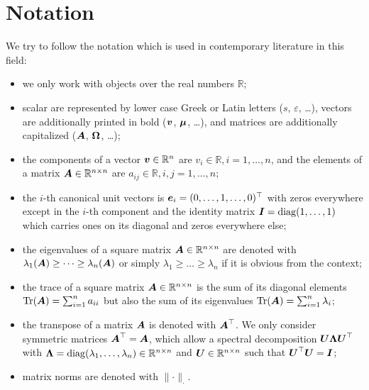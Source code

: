 \chapter*{Notation}
\label{chp:0-notation}

We try to follow the notation which is used in contemporary literature in this field:

\begin{itemize}
    \item we only work with objects over the real numbers $\mathbb{R}$;
    \item scalar are represented by lower case Greek or Latin letters ($s$, $\varepsilon$, \dots),
          vectors are additionally printed in bold ($\boldsymbol{v}$, $\boldsymbol{\mu}$, \dots),
          and matrices are additionally capitalized ($\boldsymbol{A}$, $\boldsymbol{\Omega}$, \dots);
    \item the components of a vector $\boldsymbol{v} \in \mathbb{R}^{n}$ are $v_i \in \mathbb{R}, i = 1, \dots, n$,
          and the elements of a matrix $\boldsymbol{A} \in \mathbb{R}^{n \times n}$ are $a_{ij} \in \mathbb{R}, i, j = 1, \dots, n$;
    \item the $i$-th canonical unit vectors is $\boldsymbol{e}_i = (0, \dots, 1, \dots, 0)^{\top}$
          with zeros everywhere except in the $i$-th component and the identity matrix
          $\boldsymbol{I} = \operatorname{diag}(1, \dots, 1)$ which carries ones on its diagonal and 
          zeros everywhere else;
    \item the eigenvalues of a square matrix $\boldsymbol{A} \in \mathbb{R}^{n \times n}$
          are denoted with $\lambda_1(\boldsymbol{A}) \geq \dots \geq \lambda_n(\boldsymbol{A})$
          or simply $\lambda_1 \geq \dots \geq \lambda_n$ if it is obvious from
          the context;
    \item the trace of a square matrix $\boldsymbol{A} \in \mathbb{R}^{n \times n}$ is
          the sum of its diagonal elements $\operatorname{Tr}(\boldsymbol{A}) = \sum_{i=1}^n a_{ii}$
          but also the sum of its eigenvalues $\operatorname{Tr}(\boldsymbol{A}) = \sum_{i=1}^n \lambda_i$;
    \item the transpose of a matrix $\boldsymbol{A}$ is denoted with $\boldsymbol{A}^{\top}$.
          We only consider symmetric matrices $\boldsymbol{A}^{\top} = \boldsymbol{A}$, which
          allow a spectral decomposition $\boldsymbol{U} \boldsymbol{\Lambda} \boldsymbol{U}^{\top}$
          with $\boldsymbol{\Lambda} = \operatorname{diag}(\lambda_1, \dots, \lambda_n) \in \mathbb{R}^{n \times n}$ and 
          $\boldsymbol{U} \in \mathbb{R}^{n \times n}$ such that $\boldsymbol{U}^{\top} \boldsymbol{U} = \boldsymbol{I}$;
    \item matrix norms are denoted with $\lVert \cdot \rVert _{\cdot}$.

\end{itemize}

